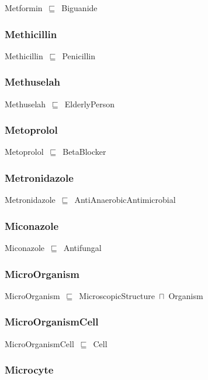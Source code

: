 \documentclass{article}
\begin{document}
Metformin~\ensuremath{\sqsubseteq}~Biguanide~

\subsubsection*{Methicillin}

Methicillin~\ensuremath{\sqsubseteq}~Penicillin~

\subsubsection*{Methuselah}

Methuselah~\ensuremath{\sqsubseteq}~ElderlyPerson~

\subsubsection*{Metoprolol}

Metoprolol~\ensuremath{\sqsubseteq}~BetaBlocker~

\subsubsection*{Metronidazole}

Metronidazole~\ensuremath{\sqsubseteq}~AntiAnaerobicAntimicrobial~

\subsubsection*{Miconazole}

Miconazole~\ensuremath{\sqsubseteq}~Antifungal~

\subsubsection*{MicroOrganism}

MicroOrganism~\ensuremath{\sqsubseteq}~MicroscopicStructure~\ensuremath{\sqcap}~Organism~

\subsubsection*{MicroOrganismCell}

MicroOrganismCell~\ensuremath{\sqsubseteq}~Cell~

\subsubsection*{Microcyte}
\end{document}
